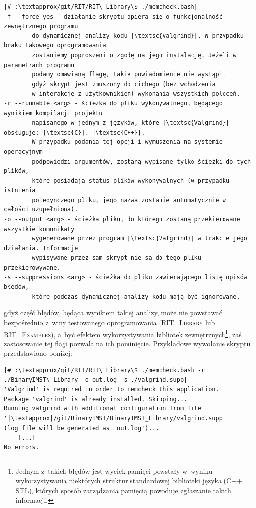 \begin{verbatim}
|# :\textapprox/git/RIT/RIT\_Library\$ ./memcheck.bash|
-f --force-yes - działanie skryptu opiera się o funkcjonalność zewnętrznego programu 
		do dynamicznej analizy kodu |\textsc{Valgrind}|. W przypadku braku takowego oprogramowania 
		zostaniemy poproszeni o zgodę na jego instalację. Jeżeli w parametrach programu
		podamy omawianą flagę, takie powiadomienie nie wystąpi, 
		gdyż skrypt jest zmuszony do cichego (bez wchodzenia 
		w interakcję z użytkownikiem) wykonania wszystkich poleceń.
-r --runnable <arg> - ścieżka do pliku wykonywalnego, będącego wynikiem kompilacji projektu 
		napisanego w jednym z języków, które |\textsc{Valgrind}| obsługuje: |\textsc{C}|, |\textsc{C++}|. 
		W przypadku podania tej opcji i wymuszenia na systemie operacyjnym 
		podpowiedzi argumentów, zostaną wypisane tylko ścieżki do tych plików, 
		które posiadają status plików wykonywalnych (w przypadku istnienia 
		pojedynczego pliku, jego nazwa zostanie automatycznie w całości uzupełniona).
-o --output <arg> - ścieżka pliku, do którego zostaną przekierowane wszystkie komunikaty 
		wygenerowane przez program |\textsc{Valgrind}| w trakcie jego działania. Informacje
		wypisywane przez sam skrypt nie są do tego pliku przekierowywane.
-s --suppressions <arg> - ścieżka do pliku zawierającego listę opisów błędów, 
		które podczas dynamicznej analizy kodu mają być ignorowane,
\end{verbatim}
gdyż część błędów, będąca wynikiem takiej analizy, może nie powstawać bezpośrednio z~winy testowanego oprogramowania (\textsc{RIT\_Library} lub \textsc{RIT\_Examples}), a~być efektem wykorzystywania bibliotek zewnętrznych\footnote{
	Jednym z~takich błędów jest wyciek pamięci powstały w~wyniku wykorzystywania niektórych struktur standardowej biblioteki języka (\textsc{C++ STL}), których sposób zarządzania pamięcią powoduje zgłaszanie takich informacji.
}, zaś zastosowanie tej flagi pozwala na ich pominięcie.
Przykładowe wywołanie skryptu przedstawiono poniżej:

\begin{verbatim}
|# :\textapprox/git/RIT/RIT\_Library\$ ./memcheck.bash -r ./BinaryIMST\_Library -o out.log -s ./valgrind.supp|
'Valgrind' is required in order to memcheck this application.
Package 'valgrind' is already installed. Skipping...
Running valgrind with additional configuration from file 
'|\textapprox|/git/BinaryIMST/BinaryIMST_Library/valgrind.supp' 
(log file will be generated as 'out.log')...
	[...]
No errors.
\end{verbatim}

